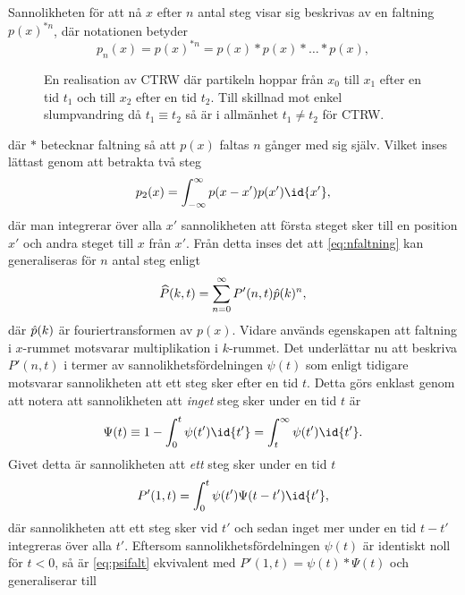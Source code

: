Sannolikheten för att nå $x$ efter $n$ antal steg visar sig beskrivas av en faltning $p(x)^{*n}$, där notationen betyder 
\begin{equation}
p_n(x) = p(x)^{*n} = p(x)*p(x)*\ldots*p(x),
\end{equation}
\begin{figure}
    \centering
    
    \caption{En realisation av CTRW där partikeln hoppar från $x_0$ till $x_1$ efter en tid $t_1$ och till $x_2$ efter en tid $t_2$. Till skillnad mot enkel slumpvandring då $t_1\equiv t_2$ så är i allmänhet $t_1\neq t_2$ för CTRW.}
    \label{fig:CTRW}
\end{figure}
där $*$ betecknar faltning så att $p(x)$ faltas $n$ gånger med sig själv. Vilket inses lättast genom att betrakta två steg
\begin{equation}\label{eq:nfaltning}
    p_2(x) = \int_{-\infty}^{\infty} p(x-x')p(x')\id{x'},
\end{equation}
där man integrerar över alla $x'$ sannolikheten att första steget sker till en position $x'$ och andra steget till $x$ från $x'$. Från detta inses det att \eqref{eq:nfaltning} kan generaliseras för $n$ antal steg enligt
\begin{equation}\label{eq:Pfour}
\widehat{P} (k,t) =\sum_{n=0}^{\infty} P'(n,t)\hat{p} (k)^n,
\end{equation}
där $\hat{p} (k)$ är fouriertransformen av $p(x)$. Vidare används egenskapen att faltning i $x$-rummet motsvarar multiplikation i $k$-rummet. Det underlättar nu att beskriva $P'(n,t)$ i termer av sannolikhetsfördelningen $\psi (t)$ som enligt tidigare motsvarar sannolikheten att ett steg sker efter en tid $t$. Detta görs enklast genom att notera att sannolikheten att \emph{inget} steg sker under en tid $t$ är 
\begin{equation}\label{eq:nojump}
\Psi (t) \equiv 1-\int_0^t \psi(t')\id{t'} = \int_t^{\infty} \psi(t')\id{t'}. 
\end{equation}
Givet detta är sannolikheten att \emph{ett} steg sker under en tid $t$
\begin{equation}\label{eq:psifalt}
P'(1,t) = \int_0^t\psi(t')\Psi(t-t')\id{t'},
\end{equation}
där sannolikheten att ett steg sker vid $t'$ och sedan inget mer under en tid $t-t'$ integreras över alla $t'$. Eftersom sannolikhetsfördelningen $\psi (t)$ är identiskt noll för $t<0$, så är \eqref{eq:psifalt} ekvivalent med $P'(1,t) = \psi(t)*\Psi(t)$ och generaliserar till
